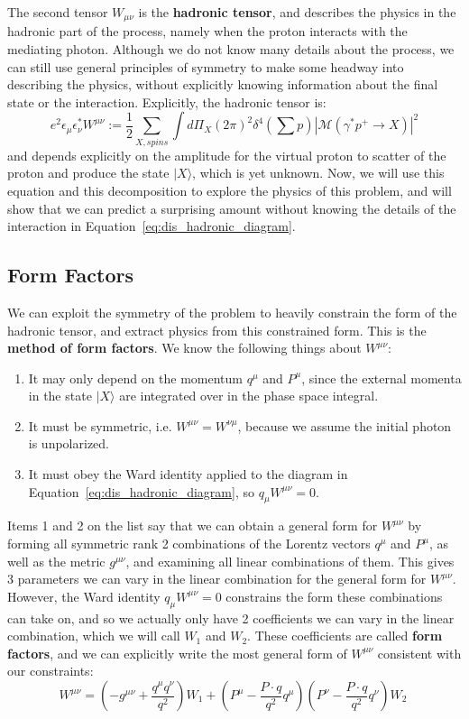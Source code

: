 \documentclass[11pt, oneside]{article}   	%
\theoremstyle{definition}
\begin{document}
The second tensor $W_{\mu\nu}$ is the \textbf{hadronic tensor}, and describes the physics in the hadronic part of the process, 
namely when the proton interacts with the mediating photon. Although we do not know many details about the process, we can still 
use general principles of symmetry to make some headway into describing the physics, without explicitly knowing information 
about the final state or the interaction. Explicitly, the hadronic tensor is:
\begin{equation}
	e^2\epsilon_\mu\epsilon_\nu^* W^{\mu\nu} := \frac{1}{2}\sum_{X, spins} \int d\Pi_X (2\pi)^2\delta^4\left(\sum p\right)
	|\mathcal M(\gamma^*p^+\rightarrow X)|^2
\end{equation}
and depends explicitly on the amplitude for the virtual proton to scatter of the proton and produce the state $|X\rangle$, which is 
yet unknown. Now, we will use this equation and this decomposition to explore the physics of this problem, and will show that 
we can predict a surprising amount without knowing the details of the interaction in Equation~\ref{eq:dis_hadronic_diagram}.

\subsection{Form Factors}

We can exploit the symmetry of the problem to heavily constrain the form of the hadronic tensor, and 
extract physics from this constrained form. This is the \textbf{method of form factors}. We know the following things about 
$W^{\mu\nu}$:
\begin{enumerate}
	\item It may only depend on the momentum $q^\mu$ and $P^\mu$, since the external momenta in the state $|X\rangle$ are 
	integrated over in the phase space integral. 
	\item It must be symmetric, i.e. $W^{\mu\nu} = W^{\nu\mu}$, because we assume the initial photon is unpolarized. 
	\item It must obey the Ward identity applied to the diagram in Equation~\ref{eq:dis_hadronic_diagram}, so $q_\mu W^{\mu\nu} = 0$. 
\end{enumerate}

Items 1 and 2 on the list say that we can obtain a general form for $W^{\mu\nu}$ by forming all symmetric rank 2 combinations 
of the Lorentz vectors $q^\mu$ and $P^\mu$, as well as the metric $g^{\mu\nu}$, and examining all linear combinations of 
them. This gives 3 parameters we can vary in the linear combination for the general form for $W^{\mu\nu}$. 
However, the Ward identity $q_\mu W^{\mu\nu} = 0$ constrains the form these combinations can take on, and so we actually 
only have 2 coefficients we can vary in the linear combination, which we will call $W_1$ and $W_2$. These coefficients are called 
\textbf{form factors}, and we can explicitly write the most general form of $W^{\mu\nu}$ consistent with our constraints:
\begin{equation}
	W^{\mu\nu} = \left(-g^{\mu\nu} + \frac{q^\mu q^\nu}{q^2}\right) W_1 + \left(P^\mu - \frac{P\cdot q}{q^2}q^\mu\right)\left(P^\nu - 
	\frac{P\cdot q}{q^2}q^\nu\right) W_2~
	\label{eq:form_factors}
\end{equation}
\end{document}
